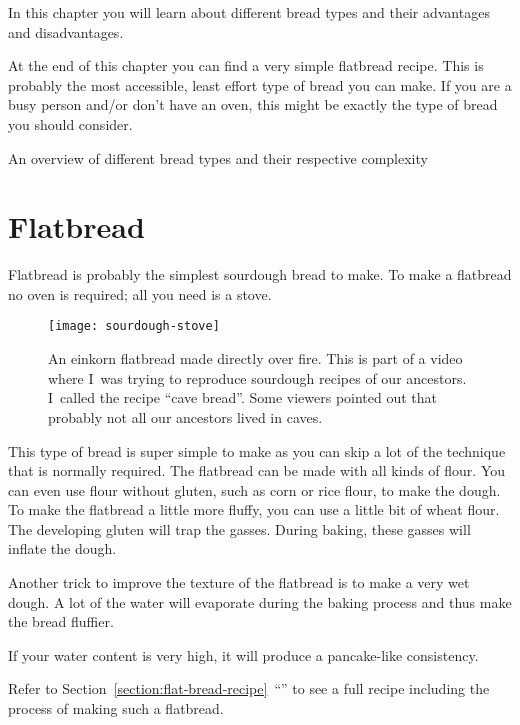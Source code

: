 In this chapter you will learn about different bread types
and their advantages and disadvantages.

At the end of this chapter
you can find a very simple flatbread recipe. This is probably
the most accessible, least effort type of bread you can make.
If you are a busy person and/or don't have an oven, this might
be exactly the type of bread you should consider.

\begin{table}[!htb]
    \begin{center}
        
        \caption{An overview of different bread types and their respective complexity}
    \end{center}
  \label{tab:bread-types-comparison}
\end{table}

\section{Flatbread}

Flatbread is probably the simplest sourdough bread to make.
To make a flatbread no oven is required; all you need is a stove.

\begin{figure}[!htb]
  \texttt{[image: sourdough-stove]}
  \caption{An einkorn flatbread made directly over fire. This
  is part of a video where I~was trying to reproduce sourdough
  recipes of our ancestors. I~called the recipe ``cave bread''. Some viewers
  pointed out that probably not all our ancestors lived in caves.
  }
\end{figure}

This type of bread is super simple to make as you can skip
a lot of the technique that is normally required. The flatbread
can be made with all kinds of flour. You can even use
flour without gluten, such as corn or rice flour, to make the
dough. To make the flatbread a little more fluffy, you
can use a little bit of wheat flour. The developing gluten
will trap the gasses. During baking, these gasses will
inflate the dough.

Another trick to improve the texture of the flatbread is to
make a very wet dough. A lot of the water will evaporate
during the baking process and thus make the bread fluffier.

If your water content is very high, it will produce a
pancake-like consistency.

Refer to Section~\ref{section:flat-bread-recipe}~``''
to see a full recipe including the process of making such a flatbread.

